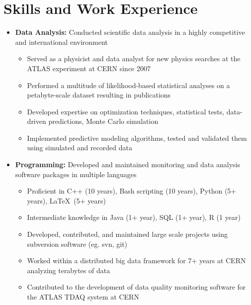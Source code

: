 \documentclass{myfancycv}
\begin{document}
\makeheader

\section{Skills and Work Experience}
\begin{itemize}

\item {\textbf{Data Analysis:} Conducted scientific data analysis in a highly competitive and international environment
{\begin{itemize}\setlength\itemindent{-2.2em}
	 \item Served as a physicist and data analyst for new physics searches at the ATLAS experiment at CERN since 2007
	 \item Performed a multitude of likelihood-based statistical analyses on a petabyte-scale dataset resulting in publications
	 \item Developed expertise on optimization techniques, statistical tests, data-driven predictions, Monte Carlo simulation
	 \item Implemented predictive modeling algorithms, tested and validated them using simulated and recorded data
\end{itemize}}%
}

\vspace{6pt}

\item {\textbf{Programming:} Developed and maintained monitoring and data analysis software packages in multiple languages
{\begin{itemize}\setlength\itemindent{-2.2em}
	\item Proficient in C++ (10 years), Bash scripting (10 years), Python (5+ years), \LaTeX\ (5+ years)
	\item Intermediate knowledge in Java (1+ year), SQL (1+ year), R (1 year)
	\item Developed, contributed, and maintained large scale projects using subversion software (eg. svn, git)
	\item Worked within a distributed big data framework for 7+ years at CERN analyzing terabytes of data
	\item Contributed to the development of data quality monitoring software for the ATLAS TDAQ system at CERN
\end{itemize}}%
}

\vspace{6pt}


\end{itemize}
\end{document}
